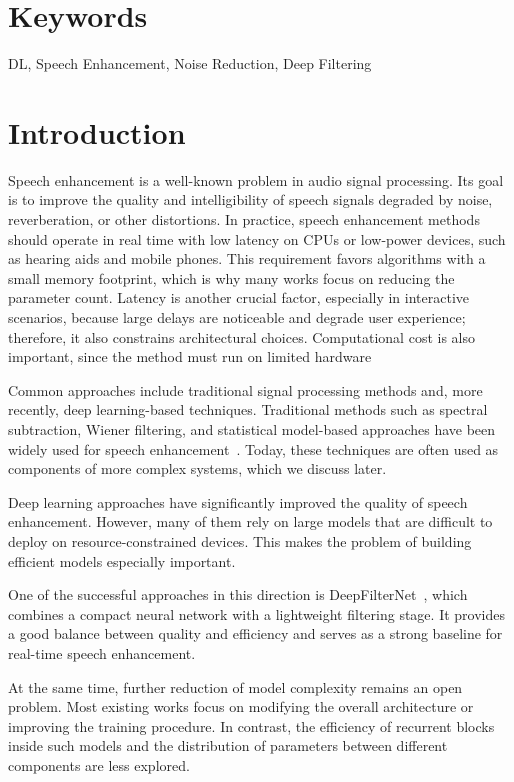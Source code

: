 \documentclass[a4paper,12pt]{extarticle}
\begin{document}
\section*{Keywords}
DL, Speech Enhancement, Noise Reduction, Deep Filtering
\pagebreak

\section{Introduction}

Speech enhancement is a well-known problem in audio signal processing. Its goal is to improve the quality and
intelligibility of speech signals degraded by noise, reverberation, or other distortions. In practice, speech enhancement methods should operate in real time with low latency on CPUs or low-power
devices, such as hearing aids and mobile phones. This requirement favors algorithms with a small memory
footprint, which is why many works focus on reducing the parameter count. Latency is another crucial factor,
especially in interactive scenarios, because large delays are noticeable and degrade user experience;
therefore, it also constrains architectural choices. Computational cost is also important, since the
method must run on limited hardware

Common approaches include traditional signal processing methods and, more recently, deep learning-based
techniques. Traditional methods such as spectral subtraction, Wiener filtering, and statistical model-based
approaches have been widely used for speech enhancement~\cite{bookse}. Today, these techniques are often used as components
of more complex systems, which we discuss later.

Deep learning approaches have significantly improved the quality of speech enhancement. However, many of them rely on 
large models that are difficult to deploy on resource-constrained devices. This makes the problem of building efficient 
models especially important.

One of the successful approaches in this direction is DeepFilterNet~\cite{dfn}, which combines a compact neural network with a
lightweight filtering stage. It provides a good balance between quality and efficiency and serves as a strong baseline
for real-time speech enhancement.

At the same time, further reduction of model complexity remains an open problem. Most existing works focus on modifying
the overall architecture or improving the training procedure. In contrast, the efficiency of recurrent blocks inside
such models and the distribution of parameters between different components are less explored.
\end{document}
